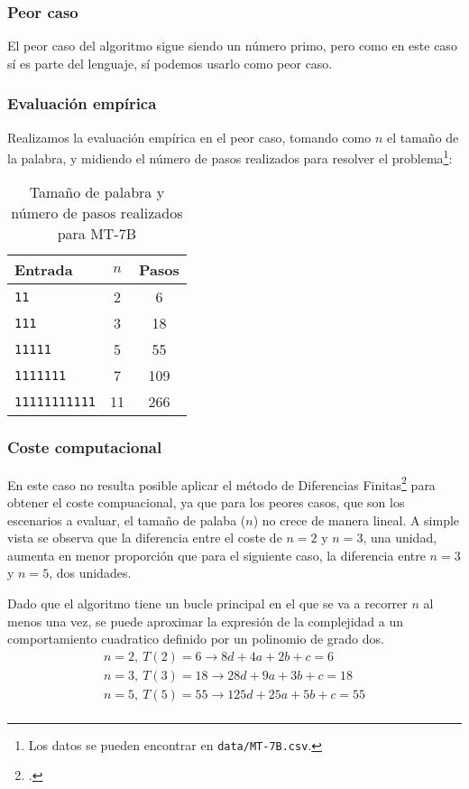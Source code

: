

\subsubsection*{Peor caso}
El peor caso del algoritmo sigue siendo un número primo, pero como en este caso sí es parte del lenguaje, sí podemos usarlo como peor caso.


\subsubsection*{Evaluación empírica}
Realizamos la evaluación empírica en el peor caso, tomando como $n$ el tamaño de la palabra, y midiendo el número de pasos realizados para resolver el problema\footnote{Los datos se pueden encontrar en \texttt{data/MT-7B.csv}.}:

\begin{table}[h]
    \centering
    \begin{tabular}{lcc}
        Entrada & $n$ & Pasos \\
        \hline
        \texttt{11}            &  2  & 6   \\
        \texttt{111}           &  3  & 18  \\
        \texttt{11111}         &  5  & 55  \\
        \texttt{1111111}       &  7  & 109 \\
        \texttt{11111111111}   & 11  & 266 \\
    \end{tabular}
    \caption{Tamaño de palabra y número de pasos realizados para MT-7B}
\end{table}


\subsubsection*{Coste computacional}
En este caso no resulta posible aplicar el método de Diferencias Finitas\footcite[ver][pgs. 1-42: \textit{Chapter 1. Difference Tables and Polynomial Fits}]{cuoco2005mathematical} para obtener el coste compuacional, ya que para los peores casos, que son los escenarios a evaluar, el tamaño de palaba ($n$) no crece de manera lineal. A simple vista se observa que la diferencia entre el coste de $n=2$ y $n=3$, una unidad, aumenta en menor proporción que para el siguiente caso, la diferencia entre $n=3$ y $n=5$, dos unidades.\medskip

Dado que el algoritmo tiene un bucle principal en el que se va a recorrer $n$ al menos una vez, se puede aproximar la expresión de la complejidad a un comportamiento cuadratico definido por un polinomio de grado dos.
\begin{subequations}
    \begin{gather*}
        n = 2,\ T(2) = 6  \rightarrow 8d + 4a  + 2b + c = 6 \\
        n = 3,\ T(3) = 18 \rightarrow 28d + 9a  + 3b + c = 18 \\
        n = 5,\ T(5) = 55 \rightarrow 125d + 25a + 5b + c = 55\\
    \end{gather*}
\end{subequations}

